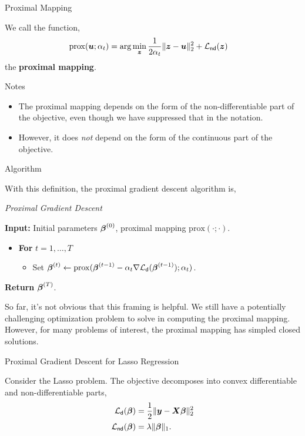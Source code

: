 \documentclass[aspectratio=169]{beamer}
\begin{document}
\begin{frame}[t,allowframebreaks]{Proximal Mapping}\label{proximal-mapping}

We call the function, \begin{align}
\mathrm{prox}(\boldsymbol{u}; \alpha_t) 
&= \arg \min_{\boldsymbol{z}} \frac{1}{2 \alpha_t} \| \boldsymbol{z} - \boldsymbol{u} \|_2^2 + \mathcal{L}_{\mathsf{nd}}(\boldsymbol{z})
\end{align} the \textbf{proximal mapping}.

Notes
\begin{itemize}
    \item The proximal mapping depends on the form of the non-differentiable part of the objective, even though we
have suppressed that in the notation. 
    \item However, it does \emph{not} depend on the form of the continuous part of the objective. 
\end{itemize}
\end{frame}

\begin{frame}[t,allowframebreaks]{Algorithm}\label{algorithm}

With this definition, the proximal gradient descent algorithm is,

\textit{Proximal Gradient Descent}

\textbf{Input:} Initial parameters \(\boldsymbol{\beta}^{(0)}\), proximal mapping
\(\mathrm{prox}(\cdot; \cdot)\).

\begin{itemize}
\item
  \textbf{For} \(t=1,\ldots, T\)

  \begin{itemize}
  \item Set
    \(\boldsymbol{\beta}^{(t)} \leftarrow \mathrm{prox}(\boldsymbol{\beta}^{(t-1)} - \alpha_t \nabla \mathcal{L}_{\mathsf{d}}(\boldsymbol{\beta}^{(t-1)}); \alpha_t)\).
  \end{itemize}
\end{itemize}

\textbf{Return} \(\boldsymbol{\beta}^{(T)}\). 

So far, it's not obvious that this framing is helpful. We still have a
potentially challenging optimization problem to solve in computing the
proximal mapping. However, for many problems of interest, the proximal
mapping has simpled closed solutions.
\end{frame}

\begin{frame}[t,allowframebreaks]{Proximal Gradient Descent for Lasso
Regression}\label{proximal-gradient-descent-for-lasso-regression}

Consider the Lasso problem. The objective decomposes into convex
differentiable and non-differentiable parts, \begin{align*}
\mathcal{L}_{\mathsf{d}}(\boldsymbol{\beta}) &= \frac{1}{2} \|\boldsymbol{y} - \boldsymbol{X} \boldsymbol{\beta}\|_2^2 \\
\mathcal{L}_{\mathsf{nd}}(\boldsymbol{\beta}) &= \lambda \|\boldsymbol{\beta}\|_1.
\end{align*}
\end{frame}
\end{document}

